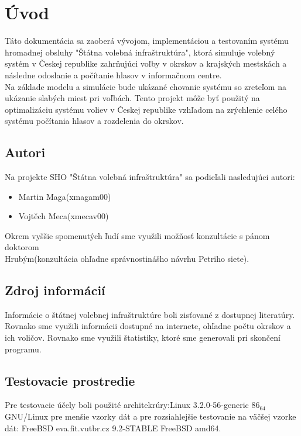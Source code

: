 \documentclass[12pt,a4paper,titlepage,final]{article}
\begin{document}


\tableofcontents
\newpage

\section{Úvod}
Táto dokumentácia sa zaoberá vývojom, implementáciou a testovaním systému hromadnej obsluhy "Štátna volebná infraštruktúra", ktorá simuluje\cite{Kutis:Simulace} volebný systém v Českej republike zahrňujúci voľby v okrskov a krajských mestskách a následne odoslanie a počítanie hlasov v informačnom centre.\\

Na základe modelu a simulácie bude ukázané chovanie systému so zreteľom na ukázanie slabých miest pri voľbách. Tento projekt môže byť použitý na optimalizáciu systému voliev v Českej republike vzhľadom na zrýchlenie celého systému počítania hlasov a rozdelenia do okrskov.

\subsection{Autori}
Na projekte SHO "Štátna volebná infraštruktúra" sa podieľali nasledujúci autori:
\begin{itemize}
\item Martin Maga(xmagam00)
\item Vojtěch Meca(xmecav00)
\end{itemize}

Okrem vyššie spomenutých ľudí sme využili možňosť konzultácie s pánom doktorom \\ Hrubým(konzultácia ohľadne správnostinášho návrhu Petriho siete).

\subsection{Zdroj informácií}
Informácie o štátnej volebnej infraštruktúre boli zisťované z dostupnej literatúry. Rovnako sme využili informácii dostupné na internete, ohľadne počtu okrskov a ich voličov. Rovnako sme využili štatistiky, ktoré sme generovali pri skončení programu.


  


\subsection{Testovacie prostredie}
Pre testovacie účely boli použité architekrúry:Linux 3.2.0-56-generic $86_64$ GNU/Linux pre menšie vzorky dát a pre rozsiahlejšie testovanie na väčšej vzorke dát: FreeBSD eva.fit.vutbr.cz 9.2-STABLE FreeBSD amd64.
\end{document}
